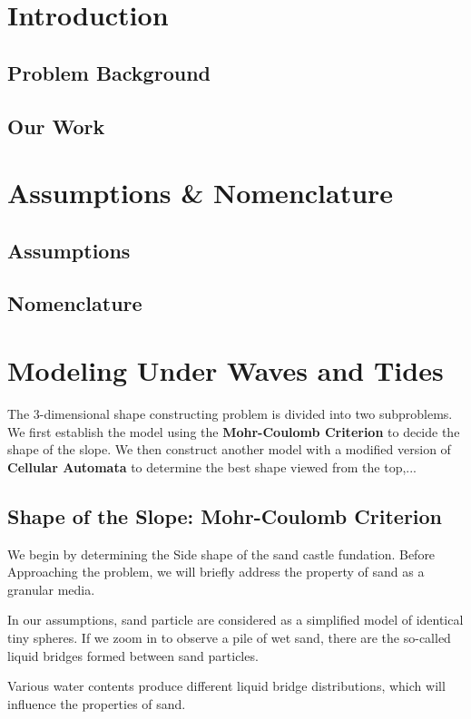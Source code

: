 \documentclass[12pt]{article}
\begin{document}
\clearpage
\pagestyle{fancy}
\tableofcontents
\newpage
\setcounter{page}{1}

\section{Introduction}
\subsection{Problem Background}
\subsection{Our Work}

\section{Assumptions \& Nomenclature}
\subsection{Assumptions}
\subsection{Nomenclature}


\section{Modeling Under Waves and Tides}
\par
The 3-dimensional shape constructing problem is divided into two subproblems. We first establish the model using the \textbf{Mohr-Coulomb Criterion} to decide the shape of the slope. We then construct another model with a modified version of \textbf{Cellular Automata} to determine the best shape viewed from the top,...

\subsection{Shape of the Slope: Mohr-Coulomb Criterion}
\par
We begin by determining the Side shape of the sand castle fundation. Before Approaching the problem, we will briefly address the property of sand as a granular media.
\par
In our assumptions, sand particle are considered as a simplified model of identical tiny spheres. If we zoom in to observe a pile of wet sand, there are the so-called liquid bridges formed between sand particles.
\par
Various water contents produce different liquid bridge distributions, which will influence the properties of sand. 
\end{document}
